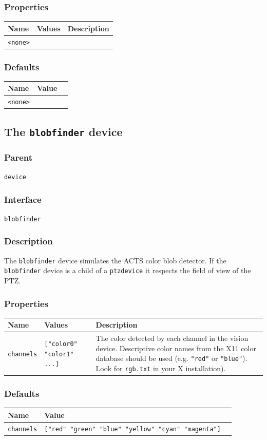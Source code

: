 \documentclass[11pt,twoside]{report}
\begin{document}
\subsubsection*{Properties}
\begin{tabularx}{\columnwidth}{llX}
\hline
Name & Values & Description \\
\hline
\verb'<none>'\\
\hline
\end{tabularx}

\subsubsection*{Defaults}
\begin{tabularx}{\columnwidth}{llX}
\hline
Name & Value\\
\hline
\verb'<none>'\\
\hline
\end{tabularx}

\newpage
\subsection{The {\tt blobfinder} device}

\subsubsection*{Parent}
{\tt device}

\subsubsection*{Interface}
{\tt blobfinder}

\subsubsection*{Description}
The \verb'blobfinder' device simulates the ACTS color blob
detector. If the \verb'blobfinder' device is a child of a
\verb'ptzdevice' it respects the field of view of the PTZ.

\subsubsection*{Properties}
\begin{tabularx}{\columnwidth}{llX}
\hline
Name & Values & Description \\
\hline
\verb'channels' & \verb'["color0" "color1" ...]' & The
color detected by each channel in the vision device.  Descriptive
color names from the X11 color database should be used
(e.g. \verb'"red"' or \verb'"blue"').  Look for \verb'rgb.txt' in your
X installation).\\
\hline
\end{tabularx}

\subsubsection*{Defaults}
\begin{tabularx}{\columnwidth}{llX}
\hline
Name & Value\\
\hline
\verb'channels' & \verb'["red" "green" "blue" "yellow" "cyan" "magenta"]'\\
\hline
\end{tabularx}



\end{document}
